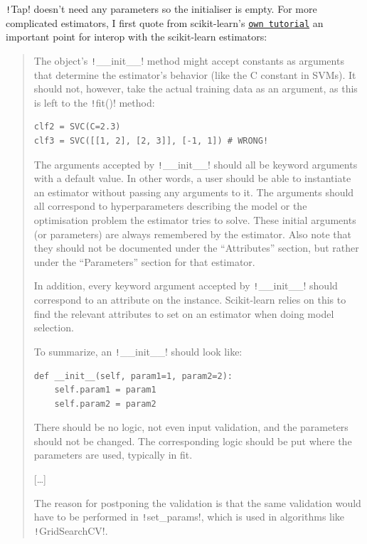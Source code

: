 \documentclass[11pt]{article}
\theoremstyle{definition}
\newcommand{\myhref}[2]{\href{#1}{\texttt{#2}}}
\begin{document}
\texttt!Tap! doesn't need any parameters so the initialiser is empty. For more complicated estimators, I first quote from scikit-learn's \myhref{https://scikit-learn.org/stable/developers/develop.html}
{own tutorial} an important point for interop with the scikit-learn estimators:
\begin{quote}
The object’s \texttt!__init__! method might accept constants as arguments that determine the estimator’s behavior (like the C constant in SVMs). It should not, however, take the actual training data as an argument, as this is left to the \texttt!fit()! method:
\begin{verbatim}
clf2 = SVC(C=2.3)
clf3 = SVC([[1, 2], [2, 3]], [-1, 1]) # WRONG!
\end{verbatim}
The arguments accepted by \texttt!__init__! should all be keyword arguments with a default value. In other words, a user should be able to instantiate an estimator without passing any arguments to it. The arguments should all correspond to hyperparameters describing the model or the optimisation problem the estimator tries to solve. These initial arguments (or parameters) are always remembered by the estimator. Also note that they should not be documented under the “Attributes” section, but rather under the “Parameters” section for that estimator.

In addition, every keyword argument accepted by \texttt!__init__! should correspond to an attribute on the instance. Scikit-learn relies on this to find the relevant attributes to set on an estimator when doing model selection.

To summarize, an \texttt!__init__! should look like:
\begin{verbatim}
def __init__(self, param1=1, param2=2):
    self.param1 = param1
    self.param2 = param2
\end{verbatim}
There should be no logic, not even input validation, and the parameters should not be changed. The corresponding logic should be put where the parameters are used, typically in fit. 

[\dots]

The reason for postponing the validation is that the same validation would have to be performed in \texttt!set_params!, which is used in algorithms like \texttt!GridSearchCV!.
\end{quote}
\end{document}
